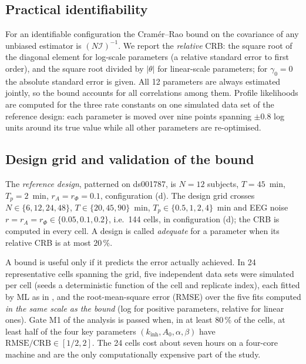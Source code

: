 \documentclass[12pt,a4paper]{article}
\theoremstyle{plain}
\theoremstyle{definition}
\theoremstyle{remark}
\newcommand{\kinh}{k_{\mathrm{inh}}}
\newcommand{\rA}{r_{A}}
\newcommand{\rPhi}{r_{\Phi}}
\newcommand{\CRB}{\mathrm{CRB}}
\newcommand{\RMSE}{\mathrm{RMSE}}
\begin{document}
\subsection{Practical identifiability}
\label{sec:practical}

For an identifiable configuration the Cram\'er--Rao bound \citep{Rao1945,Cramer1946} on the covariance of any unbiased estimator is $(N\mathcal I)^{-1}$. We report the \emph{relative} CRB: the square root of the diagonal element for log-scale parameters (a relative standard error to first order), and the square root divided by $|\theta|$ for linear-scale parameters; for $\gamma_0=0$ the absolute standard error is given. All 12 parameters are always estimated jointly, so the bound accounts for all correlations among them. Profile likelihoods \citep{Raue2009} are computed for the three rate constants on one simulated data set of the reference design: each parameter is moved over nine points spanning $\pm0.8$ log units around its true value while all other parameters are re-optimised.

\subsection{Design grid and validation of the bound}
\label{sec:grid}

The \emph{reference design}, patterned on ds001787, is $N=12$ subjects, $T=45$~min, $T_p=2$~min, $\rA=\rPhi=0.1$, configuration (d). The design grid crosses $N\in\{6,12,24,48\}$, $T\in\{20,45,90\}$~min, $T_p\in\{0.5,1,2,4\}$~min and EEG noise $r=\rA=\rPhi\in\{0.05,0.1,0.2\}$, i.e.\ 144 cells, in configuration (d); the CRB is computed in every cell. A design is called \emph{adequate} for a parameter when its relative CRB is at most $20\,\%$.

A bound is useful only if it predicts the error actually achieved. In 24 representative cells spanning the grid, five independent data sets were simulated per cell (seeds a deterministic function of the cell and replicate index), each fitted by ML as in , and the root-mean-square error (RMSE) over the five fits computed \emph{in the same scale as the bound} (log for positive parameters, relative for linear ones). Gate M1 of the analysis is passed when, in at least 80\,\% of the cells, at least half of the four key parameters $(\kinh,A_0,\alpha,\beta)$ have $\RMSE/\CRB\in[1/2,2]$. The 24 cells cost about seven hours on a four-core machine and are the only computationally expensive part of the study.
\end{document}
